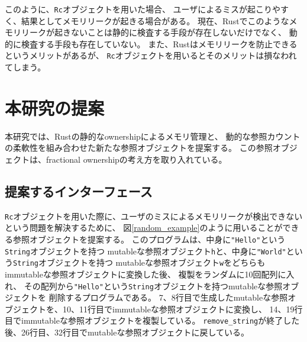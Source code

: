 \documentclass{sumiilab-paper}
\theoremstyle{mystyle}
\numberwithin{definition}{chapter} %
\begin{document}
このように、\texttt{Rc}オブジェクトを用いた場合、
ユーザによるミスが起こりやすく、結果としてメモリリークが起きる場合がある。
現在、Rustでこのようなメモリリークが起きないことは静的に検査する手段が存在しないだけでなく、
動的に検査する手段も存在していない。
また、Rustはメモリリークを防止できるというメリットがあるが、
\texttt{Rc}オブジェクトを用いるとそのメリットは損なわれてしまう。

\chapter{本研究の提案}
本研究では、Rustの静的なownershipによるメモリ管理と、
動的な参照カウントの柔軟性を組み合わせた新たな参照オブジェクトを提案する。
この参照オブジェクトは、fractional ownershipの考え方を取り入れている。

\section{提案するインターフェース}
\texttt{Rc}オブジェクトを用いた際に、ユーザのミスによるメモリリークが検出できない
という問題を解決するために、
図\ref{random_example}のように用いることができる参照オブジェクトを提案する。
このプログラムは、中身に\texttt{"Hello"}という\texttt{String}オブジェクトを持つ
mutableな参照オブジェクト\texttt{h}と、中身に\texttt{"World"}という\texttt{String}オブジェクトを持つ
mutableな参照オブジェクト\texttt{w}をどちらもimmutableな参照オブジェクトに変換した後、
複製をランダムに10回配列に入れ、
その配列から\texttt{"Hello"}という\texttt{String}オブジェクトを持つmutableな参照オブジェクトを
削除するプログラムである。
7、8行目で生成したmutableな参照オブジェクトを、10、11行目でimmutableな参照オブジェクトに変換し、
14、19行目でimmutableな参照オブジェクトを複製している。
\texttt{remove\_string}が終了した後、26行目、32行目でmutableな参照オブジェクトに戻している。
\end{document}
